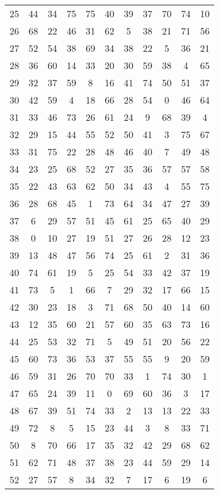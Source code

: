 \begin{table}
\begin{tabular}{c c c c c c c c c c c }
25 & 44 & 34 & 75 & 75 & 40 & 39 & 37 & 70 & 74 & 10 \\
26 & 68 & 22 & 46 & 31 & 62 & 5 & 38 & 21 & 71 & 56 \\
27 & 52 & 54 & 38 & 69 & 34 & 38 & 22 & 5 & 36 & 21 \\
28 & 36 & 60 & 14 & 33 & 20 & 30 & 59 & 38 & 4 & 65 \\
29 & 32 & 37 & 59 & 8 & 16 & 41 & 74 & 50 & 51 & 37 \\
30 & 42 & 59 & 4 & 18 & 66 & 28 & 54 & 0 & 46 & 64 \\
31 & 33 & 46 & 73 & 26 & 61 & 24 & 9 & 68 & 39 & 4 \\
32 & 29 & 15 & 44 & 55 & 52 & 50 & 41 & 3 & 75 & 67 \\
33 & 31 & 75 & 22 & 28 & 48 & 46 & 40 & 7 & 49 & 48 \\
34 & 23 & 25 & 68 & 52 & 27 & 35 & 36 & 57 & 57 & 58 \\
35 & 22 & 43 & 63 & 62 & 50 & 34 & 43 & 4 & 55 & 75 \\
36 & 28 & 68 & 45 & 1 & 73 & 64 & 34 & 47 & 27 & 39 \\
37 & 6 & 29 & 57 & 51 & 45 & 61 & 25 & 65 & 40 & 29 \\
38 & 0 & 10 & 27 & 19 & 51 & 27 & 26 & 28 & 12 & 23 \\
39 & 13 & 48 & 47 & 56 & 74 & 25 & 61 & 2 & 31 & 36 \\
40 & 74 & 61 & 19 & 5 & 25 & 54 & 33 & 42 & 37 & 19 \\
41 & 73 & 5 & 1 & 66 & 7 & 29 & 32 & 17 & 66 & 15 \\
42 & 30 & 23 & 18 & 3 & 71 & 68 & 50 & 40 & 14 & 60 \\
43 & 12 & 35 & 60 & 21 & 57 & 60 & 35 & 63 & 73 & 16 \\
44 & 25 & 53 & 32 & 71 & 5 & 49 & 51 & 20 & 56 & 22 \\
45 & 60 & 73 & 36 & 53 & 37 & 55 & 55 & 9 & 20 & 59 \\
46 & 59 & 31 & 26 & 70 & 70 & 33 & 1 & 74 & 30 & 1 \\
47 & 65 & 24 & 39 & 11 & 0 & 69 & 60 & 36 & 3 & 17 \\
48 & 67 & 39 & 51 & 74 & 33 & 2 & 13 & 13 & 22 & 33 \\
49 & 72 & 8 & 5 & 15 & 23 & 44 & 3 & 8 & 33 & 71 \\
50 & 8 & 70 & 66 & 17 & 35 & 32 & 42 & 29 & 68 & 62 \\
51 & 62 & 71 & 48 & 37 & 38 & 23 & 44 & 59 & 29 & 14 \\
52 & 27 & 57 & 8 & 34 & 32 & 7 & 17 & 6 & 19 & 6 \\

\end{tabular}
\end{table}
